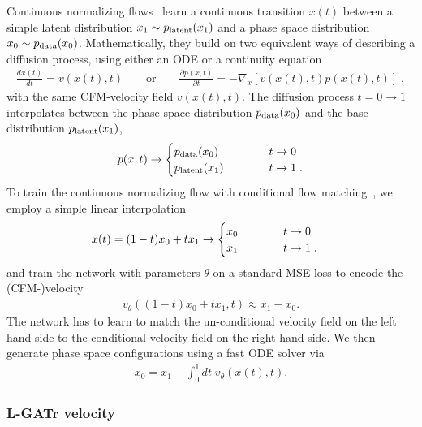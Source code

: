 \documentclass[submission, Phys]{SciPost}
\begin{document}
Continuous normalizing flows~\cite{chen2018neural} learn a continuous transition $x(t)$ between a simple latent distribution $x_1\sim p_\text{latent} (x_1)$ and a phase space distribution $x_0\sim p_\text{data} (x_0)$. Mathematically, they build on two equivalent ways of describing a diffusion process, using either an ODE or a continuity equation~\cite{Plehn:2022ftl,Butter:2023fov}
%
\begin{align}
  \frac{dx(t)}{dt} = v(x(t),t)
  \qquad \text{or} \qquad 
\frac{\partial p(x,t)}{\partial t} 
= - \nabla_x \left[ v(x(t),t) p(x(t),t) \right] \; ,
\label{eq:ode}
\end{align}
%
with the same CFM-velocity field $v(x(t),t)$. The diffusion process $t = 0 \to 1$ interpolates between the phase space distribution $p_\text{data} (x_0)$ and the base distribution $p_\text{latent} (x_1)$,
%
\begin{align}
 p(x,t) \to 
 \begin{cases}
  p_\text{data}(x_0) \qquad\quad & t \to 0 \\
  p_\text{latent}(x_1) \qquad\quad & t \to 1  \; .
 \end{cases} 
\label{eq:fm_limits}
\end{align}
%
To train the continuous normalizing flow with conditional flow matching~\cite{lipman2023flowmatchinggenerativemodeling, albergo2023stochastic}, we employ a simple linear interpolation
%
\begin{align}
    x(t) 
    &= (1-t) x_0 + t x_1 
    \to \begin{cases}
      x_0 \qquad\quad & t \to 0 \\
      x_1 \qquad\quad & t \to 1  \; .
    \end{cases} 
    \label{eq:cfm_target}
\end{align}
%
and train the network with parameters $\theta$ on a standard MSE loss to encode the (CFM-)velocity 
%
\begin{align}
v_\theta \left((1-t)x_0 + tx_1,t\right) \approx x_1 - x_0. 
\end{align}
%
The network has to learn to match the un-conditional velocity field on the left hand side to the conditional velocity field on the right hand side. We then generate phase space
configurations using a fast ODE solver via 
%
\begin{align}
    x_0 = x_1 - \int_0^1 dt\; v_\theta(x(t),t).
\end{align}
%

\subsubsection*{L-GATr velocity}
\end{document}

